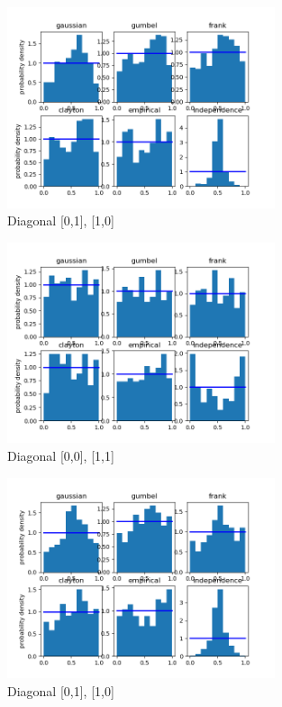 \begin{figure}[h]
	\centering
	\includegraphics[width=0.7\textwidth]{RTS/2020-02-18_06_00-2020-02-18_07_00-1.png}
	\caption{Diagonal [0,1], [1,0]}
\end{figure}



\begin{figure}[h]
	\centering
	\includegraphics[width=0.7\textwidth]{RTS/2020-04-03_15_00-2020-04-03_16_00-0.png}
	\caption{Diagonal [0,0], [1,1]}
\end{figure}

\begin{figure}[h]
	\centering
	\includegraphics[width=0.7\textwidth]{RTS/2020-04-03_15_00-2020-04-03_16_00-1.png}
	\caption{Diagonal [0,1], [1,0]}
\end{figure}


